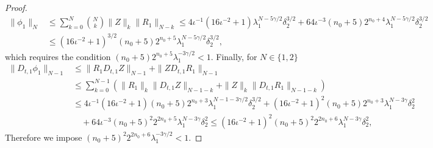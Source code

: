 \documentclass[10pt,a4paper]{amsart}
\begin{document}
\begin{proof}
\begin{align}
    \| \phi_1 \|_N
    &\leq
    \sum_{k=0}^{N} \binom{N}{k} \|Z\|_k \|R_1\|_{N-k} 
    \leq 
    4\iota^{-1}(16\iota^{-2}+1) \lambda_1^{N-5\gamma/2} \delta_2^{3/2} +64\iota^{-3} (n_0+5) 2^{n_0+4} \lambda_1^{N-5\gamma/2} \delta_2^{3/2}
    \\
    &\leq
    (16\iota^{-2}+1)^{3/2}(n_0+5) 2^{n_0+5}\lambda_1^{N-5\gamma/2} \delta_2^{3/2},
\end{align}
which requires the condition $(n_0+5) 2^{n_0+5} \lambda_1^{-3\gamma/2} < 1$.
Finally, for $N \in \{1,2\}$
\begin{align}
  \| D_{t,1}\phi_1 \|_{N-1} 
  &\leq \|R_1 D_{t,1}Z  \|_{N-1}+\|Z D_{t,1}R_1 \|_{N-1}
\\&
\leq \sum_{k=0}^{N-1} (\|R_1\|_k \|D_{t,1}Z  \|_{N-1-k} + \|Z\|_k \|D_{t,1}R_1  \|_{N-1-k})
\\
&\leq
4\iota^{-1}(16\iota^{-2}+1)(n_0+5)2^{n_0+3} \lambda_1^{N-1-3\gamma/2}\delta_2^{3/2}
+
(16\iota^{-2}+1)^2(n_0+5)2^{n_0+3} \lambda_1^{N-3\gamma}\delta_2^{2}
\\
&\quad+
64\iota^{-3}(n_0+5)^2 2^{2n_0+5} \lambda_1^{N-3\gamma} \delta_2^2
\leq
(16\iota^{-2}+1)^2(n_0+5)^2 2^{2n_0+6}\lambda_1^{N-3\gamma} \delta_2^2,
\end{align}
Therefore we impose $(n_0+5)^2 2^{2n_0+6} \lambda_1^{-3\gamma/2} < 1$.
\end{proof}
\end{document}
